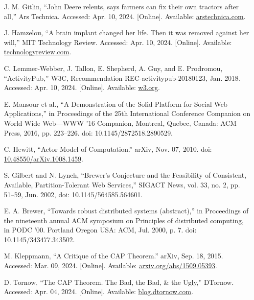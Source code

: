 \documentclass{article}
\begin{document}
\begin{thebibliography}{99}
    J. M. Gitlin, “John Deere relents, says farmers can fix their own tractors after all,” Ars Technica. Accessed: Apr. 10, 2024. [Online]. Available: \href{https://arstechnica.com/tech-
    policy/2023/01/john-deere-relents-says-farmers-can-fix-their-own-tractors-after-all/}{arstechnica.com}.

    J. Hamzelou, “A brain implant changed her life. Then it was removed against her will,” MIT Technology Review. Accessed: Apr. 10, 2024. [Online]. Available: \href{https://www.technologyreview.com/2023/05/25/1073634/brain-implant-removed-against-
her-will/}{technologyreview.com}.

    C. Lemmer-Webber, J. Tallon, E. Shepherd, A. Guy, and E. Prodromou, “ActivityPub,”
W3C, Recommendation REC-activitypub-20180123, Jan. 2018. Accessed: Apr. 10, 2024.
[Online]. Available: \href{https://www.w3.org/TR/activitypub/}{w3.org}.

    E. Mansour et al., “A Demonstration of the Solid Platform for Social Web Applications,” in Proceedings of the 25th International Conference Companion on World Wide Web---WWW ’16 Companion, Montreal, Quebec, Canada: ACM Press, 2016, pp. 223–226. doi: 10.1145/2872518.2890529.

    C. Hewitt, “Actor Model of Computation.” arXiv, Nov. 07, 2010. doi: \href{https://doi.org/10.48550/arXiv.1008.1459}{10.48550/arXiv.1008.1459}.

    S. Gilbert and N. Lynch, “Brewer’s Conjecture and the Feasibility of Consistent, Available, Partition-Tolerant Web Services,” SIGACT News, vol. 33, no. 2, pp. 51–59, Jun. 2002, doi: 10.1145/564585.564601.

    E. A. Brewer, “Towards robust distributed systems (abstract),” in Proceedings of the nineteenth annual ACM symposium on Principles of distributed computing, in PODC ’00. Portland Oregon USA: ACM, Jul. 2000, p. 7. doi: 10.1145/343477.343502.

    M. Kleppmann, “A Critique of the CAP Theorem.” arXiv, Sep. 18, 2015. Accessed: Mar. 09, 2024. [Online]. Available: \href{http://arxiv.org/abs/1509.05393}{arxiv.org/abs/1509.05393}.

    D. Tornow, “The CAP Theorem. The Bad, the Bad, \& the Ugly,” DTornow. Accessed: Apr. 04, 2024. [Online]. Available: \href{https://blog.dtornow.com/the-cap-theorem.-the-bad-
    the-bad-the-ugly/}{blog.dtornow.com}.


\end{thebibliography}
\end{document}
